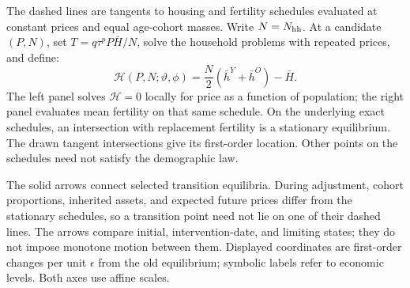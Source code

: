 \documentclass[11pt]{article}
\begin{document}
The dashed lines are tangents to housing and fertility schedules evaluated
at constant prices and equal age-cohort masses. Write $N=N_{\rm hh}$. At a
candidate $(P,N)$, set $T=q\tau^pP\bar H/N$, solve the household problems with repeated prices,
and define:
\begin{equation}
 \mathcal H(P,N;\vartheta,\phi)
 =\frac N2(\bar h^Y+\bar h^O)-\bar H.
 \label{eq:amend_figure_schedules}
\end{equation}
The left panel solves $\mathcal H=0$ locally for price as a function of
population; the right panel evaluates mean fertility on that same schedule.
On the underlying exact schedules, an intersection with replacement
fertility is a stationary equilibrium. The drawn tangent intersections give
its first-order location. Other points on the schedules need not satisfy
the demographic law.

The solid arrows connect selected transition equilibria. During adjustment,
cohort proportions, inherited assets, and expected future prices differ
from the stationary schedules, so a transition point need not lie on one
of their dashed lines. The arrows compare initial, intervention-date, and
limiting states; they do not impose monotone motion between them. Displayed coordinates are first-order changes per unit $\epsilon$ from the
old equilibrium; symbolic labels refer to economic levels. Both axes use
affine scales.
\end{document}
